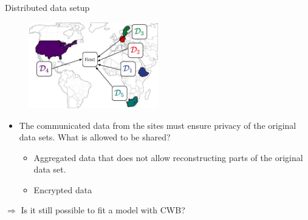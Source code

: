 \documentclass[t,10pt]{beamer}
\begin{document}
\begin{frame}{Distributed data setup}
  \begin{figure}
    \centering
    \includegraphics[width=0.5\textwidth]{figures/fig-sites-host2.png}
  \end{figure}
  \begin{itemize}
    \item The communicated data from the sites must ensure privacy of the original data sets.
  What is allowed to be shared?
  \begin{itemize}
    \item Aggregated data that does not allow reconstructing parts of the original data set.
    \item Encrypted data
  \end{itemize}
  \end{itemize}
  $\Rightarrow$ Is it still possible to fit a model with CWB?
  \addtocounter{framenumber}{-1}
\end{frame}

\end{document}
